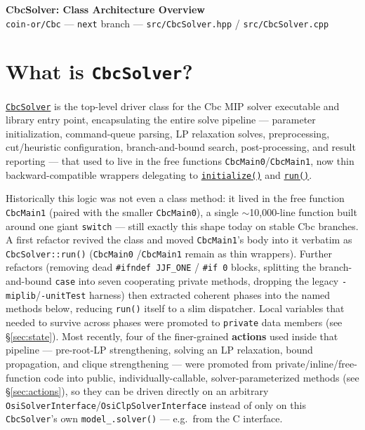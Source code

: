 \documentclass[10pt]{article}
\newcommand{\GHBASE}{https://github.com/coin-or/Cbc/blob/next/src}
\newcommand{\ghc}[2]{\href{\GHBASE/CbcSolver.cpp\#L#1}{#2}}
\newcommand{\ghh}[2]{\href{\GHBASE/CbcSolver.hpp\#L#1}{#2}}
\begin{document}
\pagestyle{empty}
\sloppy

\begin{center}
  {\Large\bfseries CbcSolver: Class Architecture Overview}\\[1pt]
  {\small \texttt{coin-or/Cbc} --- \texttt{next} branch --- \texttt{src/CbcSolver.hpp} / \texttt{src/CbcSolver.cpp}}
\end{center}
\vspace{1pt}

\section*{What is \texttt{CbcSolver}?}
\ghh{90}{\texttt{CbcSolver}} is the top-level driver class for the Cbc MIP solver executable and library
entry point, encapsulating the entire solve pipeline --- parameter initialization, command-queue
parsing, LP relaxation solves, preprocessing, cut/heuristic configuration, branch-and-bound search,
post-processing, and result reporting --- that used to live in the free functions \texttt{CbcMain0}/\texttt{CbcMain1},
now thin backward-compatible wrappers delegating to \ghc{3087}{\texttt{initialize()}} and \ghc{10464}{\texttt{run()}}.

Historically this logic was not even a class method: it lived in the free function \texttt{CbcMain1}
(paired with the smaller \texttt{CbcMain0}), a single $\sim$10{,}000-line function built around one giant
\texttt{switch} --- still exactly this shape today on stable Cbc branches. A first refactor revived the
class and moved \texttt{CbcMain1}'s body into it verbatim as \texttt{CbcSolver::run()} (\texttt{CbcMain0}%
/\texttt{CbcMain1} remain as thin wrappers). Further refactors (removing dead \texttt{\#ifndef JJF\_ONE} /
\texttt{\#if~0} blocks, splitting the branch-and-bound \texttt{case} into seven cooperating private methods,
dropping the legacy \texttt{-miplib}/\texttt{-unitTest} harness) then extracted coherent phases into the
named methods below, reducing \texttt{run()} itself to a slim dispatcher. Local variables that needed to
survive across phases were promoted to \texttt{private} data members (see \S\ref{sec:state}). Most recently,
four of the finer-grained \textbf{actions} used inside that pipeline --- pre-root-LP strengthening, solving an
LP relaxation, bound propagation, and clique strengthening --- were promoted from private/inline/free-function
code into public, individually-callable, solver-parameterized methods (see \S\ref{sec:actions}), so they can be
driven directly on an arbitrary \texttt{OsiSolverInterface}/\texttt{OsiClpSolverInterface} instead of only on this
\texttt{CbcSolver}'s own \texttt{model\_.solver()} --- e.g.\ from the C interface.
\end{document}
